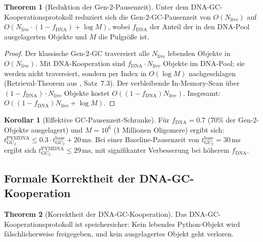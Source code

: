 ﻿\documentclass[a4paper,12pt]{article}
\theoremstyle{definition}
\newtheorem{korollar}{Korollar}[section]
\newtheorem{theorem}{Theorem}[section]
\begin{document}
\begin{theorem}[Reduktion der Gen-2-Pausenzeit]
  \label{thm:gc_pausenzeit}
  Unter dem DNA-GC-Kooperationsproto\-koll reduziert sich die Gen-2-GC-Pausenzeit
  von $O(N_{\mathrm{live}})$ auf $O(N_{\mathrm{live}} \cdot (1 - f_{\mathrm{DNA}})
  + \log M)$, wobei $f_{\mathrm{DNA}}$ der Anteil der in den DNA-Pool
  ausgelagerten Objekte und $M$ die Pulgröße ist.
\end{theorem}

\begin{proof}
  Der klassische Gen-2-GC traversiert alle $N_{\mathrm{live}}$ lebenden Objekte
  in $O(N_{\mathrm{live}})$. Mit DNA-Kooperation sind $f_{\mathrm{DNA}} \cdot N_{\mathrm{live}}$
  Objekte im DNA-Pool; sie werden nicht traversiert, sondern per Index in
  $O(\log M)$ nachgeschlagen (Retrieval-Theorem aus \cite{epp2026dnastor},
  Satz~7.3). Der verbleibende In-Memory-Scan über
  $(1-f_{\mathrm{DNA}}) \cdot N_{\mathrm{live}}$ Objekte kostet
  $O((1-f_{\mathrm{DNA}}) N_{\mathrm{live}})$. Insgesamt:
  $O((1-f_{\mathrm{DNA}}) N_{\mathrm{live}} + \log M)$.
\end{proof}

\begin{korollar}[Effektive GC-Pausenzeit-Schranke]
  Für $f_{\mathrm{DNA}} = 0.7$ (70\% der Gen-2-Objekte ausgelagert) und
  $M = 10^6$ (1 Millionen Oligomere) ergibt sich:
  $t_{\mathrm{GC}_2}^{\mathrm{PYMDNA}} \le 0.3 \cdot t_{\mathrm{GC}_2}^{\mathrm{base}} + 20\,\mathrm{ms}$.
  Bei einer Baseline-Pausenzeit von $t_{\mathrm{GC}_2}^{\mathrm{base}} = 30\,\mathrm{ms}$
  ergibt sich $t_{\mathrm{GC}_2}^{\mathrm{PYMDNA}} \le 29\,\mathrm{ms}$,
  mit signifikanter Verbesserung bei höherem $f_{\mathrm{DNA}}$.
\end{korollar}

\subsection{Formale Korrektheit der DNA-GC-Kooperation}

\begin{theorem}[Korrektheit der DNA-GC-Kooperation]
  \label{thm:dna_gc_korrekt}
  Das DNA-GC-Kooperationsproto\-koll ist speichersicher: Kein lebendes
  Python-Objekt wird fälschlicherweise freigegeben, und kein
  ausgelagertes Objekt geht verloren.
\end{theorem}
\end{document}
